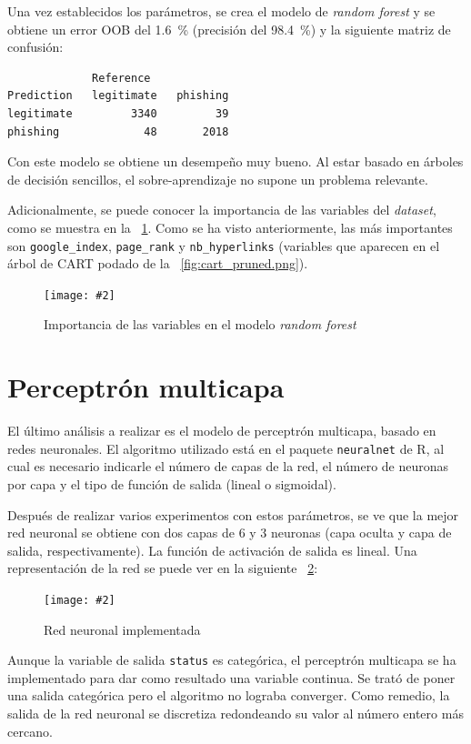 \documentclass[12pt, a4paper]{article}
\renewcommand{\textit}{\textsl}
\newcommand*{\figref}[1]{\figurename~\ref{fig:#1}}
\newcommand{\figcaption}[4][H]{
  \begin{figure}[#1]
    \centering
    \texttt{[image: \#2]}
    \caption{#3}
    \label{fig:#2}
  \end{figure}
}
\newcommand*{\dataset}{\textit{dataset}}
\begin{document}
      Una vez establecidos los parámetros, se crea el modelo de \textit{random forest} y se obtiene un error OOB del \SI{1.6}{\percent} (precisión del \SI{98.4}{\percent}) y la siguiente matriz de confusión:

      \begin{verbatim}
             Reference
Prediction   legitimate   phishing
legitimate         3340         39
phishing             48       2018
      \end{verbatim}

      Con este modelo se obtiene un desempeño muy bueno. Al estar basado en árboles de decisión sencillos, el sobre-aprendizaje no supone un problema relevante.

      Adicionalmente, se puede conocer la importancia de las variables del \dataset, como se muestra en la \figref{importance.png}. Como se ha visto anteriormente, las más importantes son \texttt{google\_index}, \texttt{page\_rank} y \texttt{nb\_hyperlinks} (variables que aparecen en el árbol de CART podado de la \figref{cart_pruned.png}).

      \figcaption{importance.png}{Importancia de las variables en el modelo \textit{random forest}}{1}

  \newpage

  \section{Perceptrón multicapa}

    El último análisis a realizar es el modelo de perceptrón multicapa, basado en redes neuronales. El algoritmo utilizado está en el paquete \texttt{neuralnet} de R, al cual es necesario indicarle el número de capas de la red, el número de neuronas por capa y el tipo de función de salida (lineal o sigmoidal).

    Después de realizar varios experimentos con estos parámetros, se ve que la mejor red neuronal se obtiene con dos capas de $6$ y $3$ neuronas (capa oculta y capa de salida, respectivamente). La función de activación de salida es lineal. Una representación de la red se puede ver en la siguiente \figref{nn.png}:

    \figcaption{nn.png}{Red neuronal implementada}{1}

    Aunque la variable de salida \texttt{status} es categórica, el perceptrón multicapa se ha implementado para dar como resultado una variable continua. Se trató de poner una salida categórica pero el algoritmo no lograba converger. Como remedio, la salida de la red neuronal se discretiza redondeando su valor al número entero más cercano.
\end{document}
